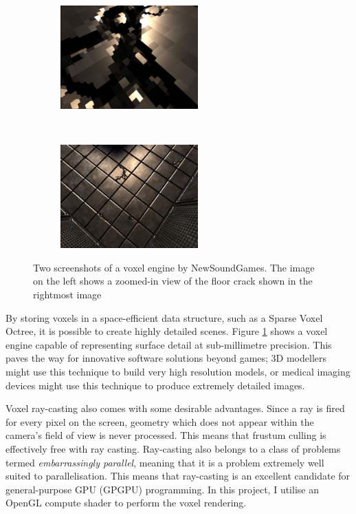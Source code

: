 \begin{figure}[ht]
    \centering
    \begin{subfigure}{0.5\textwidth}
        \centering
        \includegraphics[width=200px]{graphics/newsoundgames_svo_coarse.png}
    \end{subfigure}%
    ~
    \begin{subfigure}{0.5\textwidth}
        \centering
        \includegraphics[width=200px]{graphics/newsoundgames_svo_fine.png}
    \end{subfigure}
    
    \caption{Two screenshots of a voxel engine by NewSoundGames\autocite{newsoundgames2012}. The image on the left shows a zoomed-in view of the floor crack shown in the rightmost image}
    \label{fig:voxel_details}
\end{figure}

By storing voxels in a space-efficient data structure, such as a Sparse Voxel Octree, it is possible to create highly detailed scenes. Figure \ref{fig:voxel_details} shows a voxel engine capable of representing surface detail at sub-millimetre precision. This paves the way for innovative software solutions beyond games; 3D modellers might use this technique to build very high resolution models, or medical imaging devices might use this technique to produce extremely detailed images.

Voxel ray-casting also comes with some desirable advantages. Since a ray is fired for every pixel on the screen, geometry which does not appear within the camera's field of view is never processed. This means that frustum culling is effectively free with ray casting. Ray-casting also belongs to a class of problems termed \textit{embarrassingly parallel}, meaning that it is a problem extremely well suited to parallelisation. This means that ray-casting is an excellent candidate for general-purpose GPU (GPGPU) programming. In this project, I utilise an OpenGL compute shader to perform the voxel rendering.

